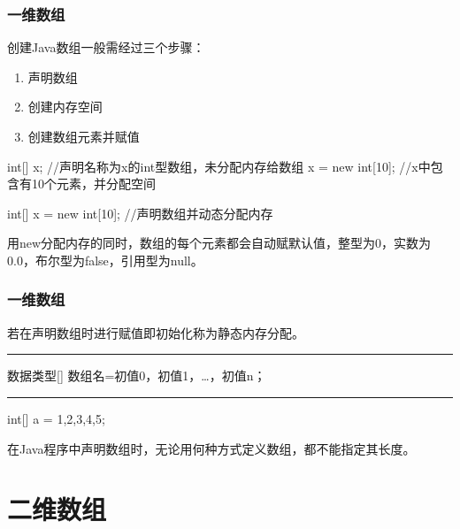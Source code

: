 \begin{frame}[fragile]
  \frametitle{一维数组}

  创建Java数组一般需经过三个步骤：

  \begin{enumerate}
  \item 声明数组
  \item 创建内存空间
  \item 创建数组元素并赋值
  \end{enumerate}
  
  
  \begin{javaCode}
    int[] x;  //声明名称为x的int型数组，未分配内存给数组
    x = new int[10];   //x中包含有10个元素，并分配空间
  \end{javaCode}

  \begin{javaCode}
    int[] x = new int[10];   //声明数组并动态分配内存
  \end{javaCode}


{\kai 用new分配内存的同时，数组的每个元素都会自动赋默认值，整型为0，实数为0.0，布尔型为false，引用型为null。}

\end{frame}

\begin{frame}[fragile]
  \frametitle{一维数组}


  若在声明数组时进行赋值即初始化称为静态内存分配。

  \rule[0pt]{10cm}{0.05em}
  
  {\kai 数据类型[] 数组名={初值0，初值1，…，初值n}；}
  
  \rule[0pt]{10cm}{0.05em}
  

  \begin{javaCode}
    int[]  a = {1,2,3,4,5};
  \end{javaCode}


在Java程序中声明数组时，无论用何种方式定义数组，都不能指定其长度。

\end{frame}

\section{二维数组}

